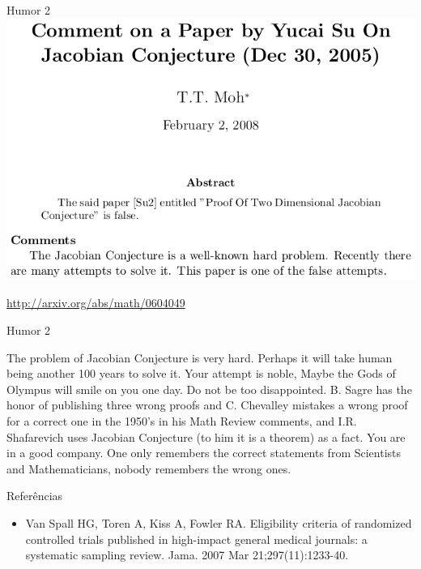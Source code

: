 \documentclass{beamer}
\begin{document}
\begin{frame}{Humor 2}
  \includegraphics[width=\textwidth]{Etapas/olympus-abs}

  \url{http://arxiv.org/abs/math/0604049}
\end{frame}

\begin{frame}{Humor 2}
  \begin{block}{}
    The problem of Jacobian Conjecture is very hard. Perhaps it will
    take human being another 100 years to solve it. \alert{Your
      attempt is noble, Maybe the Gods of Olympus will smile on you
      one day.} Do not be too disappointed. B. Sagre has the honor of
    publishing three wrong proofs and C. Chevalley mistakes a wrong
    proof for a correct one in the 1950’s in his Math Review comments,
    and I.R. Shafarevich uses Jacobian Conjecture (to him it is a
    theorem) as a fact. You are in a good company. One only remembers
    the correct statements from Scientists and Mathematicians, nobody
    remembers the wrong ones.
  \end{block}
\end{frame}

\begin{frame}{Referências}
  \begin{itemize}
  \item Van Spall HG, Toren A, Kiss A, Fowler RA. Eligibility criteria of randomized controlled trials published in high-impact general medical journals: a systematic sampling review. Jama. 2007 Mar 21;297(11):1233-40.
  \end{itemize}
\end{frame}
\end{document}
